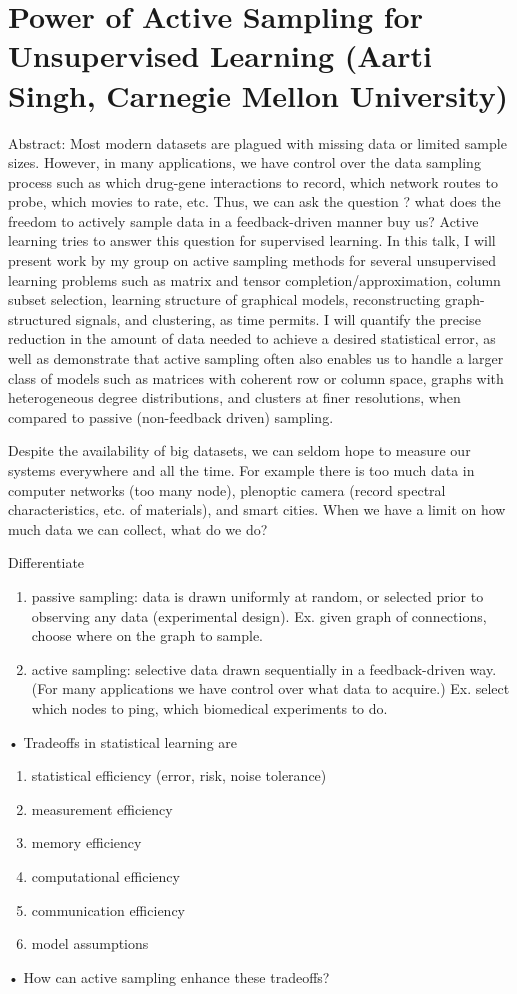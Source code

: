 \section{Power of Active Sampling for Unsupervised Learning (Aarti Singh, Carnegie Mellon University)}

Abstract: Most modern datasets are plagued with missing data or limited sample sizes. However, in many applications, we have control over the data sampling process such as which drug-gene interactions to record, which network routes to probe, which movies to rate, etc. Thus, we can ask the question ? what does the freedom to actively sample data in a feedback-driven manner buy us? Active learning tries to answer this question for supervised learning. In this talk, I will present work by my group on active sampling methods for several unsupervised learning problems such as matrix and tensor completion/approximation, column subset selection, learning structure of graphical models, reconstructing graph-structured signals, and clustering, as time permits. I will quantify the precise reduction in the amount of data needed to achieve a desired statistical error, as well as demonstrate that active sampling often also enables us to handle a larger class of models such as matrices with coherent row or column space, graphs with heterogeneous degree distributions, and clusters at finer resolutions, when compared to passive (non-feedback driven) sampling.

Despite the availability of big datasets, we can seldom hope to measure our systems everywhere and all the time. For example there is too much data in computer networks (too many node), plenoptic camera (record spectral characteristics, etc. of materials), and smart cities. When we have a limit on how much data we can collect, what do we do?

Differentiate
\begin{enumerate}
\item
passive sampling: data is drawn uniformly at random, or selected prior to observing any data (experimental design). Ex. given graph of connections, choose where on the graph to sample.
\item
active sampling: selective data drawn sequentially in a feedback-driven way. (For many applications we have control over what data to acquire.) Ex. select which nodes to ping, which biomedical experiments to do.
\end{enumerate}•
Tradeoffs in statistical learning are
\begin{enumerate}
\item
statistical efficiency (error, risk, noise tolerance)
\item
measurement efficiency
\item
memory efficiency
\item
computational efficiency
\item
communication efficiency
\item
model assumptions
\end{enumerate}•
How can active sampling enhance these tradeoffs? %

